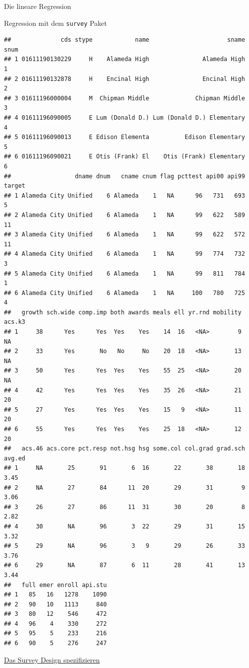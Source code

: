 \documentclass[ignorenonframetext,]{beamer}
\begin{document}
\begin{frame}[fragile]{Die lineare Regression}
\begin{block}{Regression mit dem \texttt{survey} Paket}
\begin{verbatim}
##              cds stype            name                      sname snum
## 1 01611190130229     H    Alameda High               Alameda High    1
## 2 01611190132878     H    Encinal High               Encinal High    2
## 3 01611196000004     M  Chipman Middle             Chipman Middle    3
## 4 01611196090005     E Lum (Donald D.) Lum (Donald D.) Elementary    4
## 5 01611196090013     E Edison Elementa          Edison Elementary    5
## 6 01611196090021     E Otis (Frank) El    Otis (Frank) Elementary    6
##                  dname dnum   cname cnum flag pcttest api00 api99 target
## 1 Alameda City Unified    6 Alameda    1   NA      96   731   693      5
## 2 Alameda City Unified    6 Alameda    1   NA      99   622   589     11
## 3 Alameda City Unified    6 Alameda    1   NA      99   622   572     11
## 4 Alameda City Unified    6 Alameda    1   NA      99   774   732      3
## 5 Alameda City Unified    6 Alameda    1   NA      99   811   784      1
## 6 Alameda City Unified    6 Alameda    1   NA     100   780   725      4
##   growth sch.wide comp.imp both awards meals ell yr.rnd mobility acs.k3
## 1     38      Yes      Yes  Yes    Yes    14  16   <NA>        9     NA
## 2     33      Yes       No   No     No    20  18   <NA>       13     NA
## 3     50      Yes      Yes  Yes    Yes    55  25   <NA>       20     NA
## 4     42      Yes      Yes  Yes    Yes    35  26   <NA>       21     20
## 5     27      Yes      Yes  Yes    Yes    15   9   <NA>       11     20
## 6     55      Yes      Yes  Yes    Yes    25  18   <NA>       12     20
##   acs.46 acs.core pct.resp not.hsg hsg some.col col.grad grad.sch avg.ed
## 1     NA       25       91       6  16       22       38       18   3.45
## 2     NA       27       84      11  20       29       31        9   3.06
## 3     26       27       86      11  31       30       20        8   2.82
## 4     30       NA       96       3  22       29       31       15   3.32
## 5     29       NA       96       3   9       29       26       33   3.76
## 6     29       NA       87       6  11       28       41       13   3.44
##   full emer enroll api.stu
## 1   85   16   1278    1090
## 2   90   10   1113     840
## 3   80   12    546     472
## 4   96    4    330     272
## 5   95    5    233     216
## 6   90    5    276     247
\end{verbatim}

\end{block}

\begin{block}{\href{https://www.r-bloggers.com/linear-models-with-weighted-observations/}{Das
Survey Design spezifizieren}}


\end{block}
\end{frame}
\end{document}

